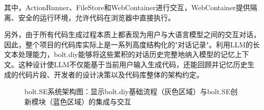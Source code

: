 其中，ActionRunner、FileStore和WebContainer进行交互，WebContainer提供隔离、安全的运行环境，允许代码在浏览器中直接执行。

另外，由于所有代码生成过程本质上都表现为用户与大语言模型之间的交互对话，因此，整个项目的代码库实际上是一系列高度结构化的"对话记录"。利用LLM的长文本处理能力，bolt.diy能够将这些累积的对话历史完整地纳入模型的记忆上下文。这种设计使LLM不仅能基于当前用户输入生成代码，还能回顾并记忆历史生成的代码片段、开发者的设计决策以及代码库整体的架构约定。

\begin{figure}[H]
  \caption{bolt.SE系统架构图：显示bolt.diy基础流程（灰色区域）与bolt.SE创新模块（蓝色区域）的集成与交互}
  \label{fig:bolt_sequence}
\end{figure}
    
    
